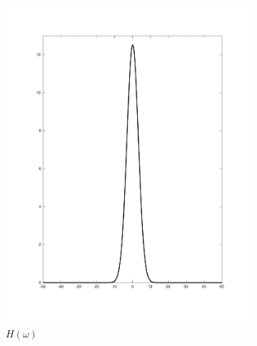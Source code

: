 \documentclass[tikz,14pt,fleqn]{article}
\begin{document}
\begin{figure}[H]
    \centering
    \begin{subfigure}{0.49\linewidth}
        \centering
        \includegraphics[width=\linewidth]{fig/5.hw.pdf}
        \caption{$H(\omega)$}
        \label{fig:ex5-Hw}
    \end{subfigure}
    \begin{subfigure}{0.49\linewidth}
        \centering

\end{subfigure}
\end{figure}
\end{document}
